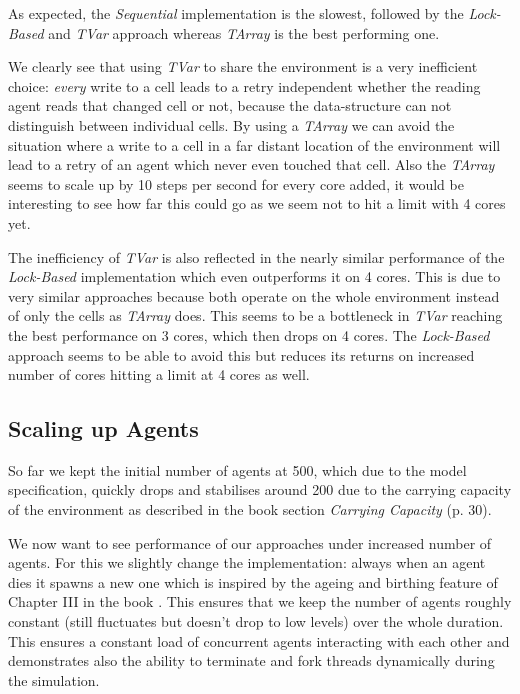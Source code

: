 As expected, the \textit{Sequential} implementation is the slowest, followed by the \textit{Lock-Based} and \textit{TVar} approach whereas \textit{TArray} is the best performing one.

We clearly see that using \textit{TVar} to share the environment is a very inefficient choice: \textit{every} write to a cell leads to a retry independent whether the reading agent reads that changed cell or not, because the data-structure can not distinguish between individual cells. By using a \textit{TArray} we can avoid the situation where a write to a cell in a far distant location of the environment will lead to a retry of an agent which never even touched that cell. Also the \textit{TArray} seems to scale up by 10 steps per second for every core added, it would be interesting to see how far this could go as we seem not to hit a limit with 4 cores yet.

The inefficiency of \textit{TVar} is also reflected in the nearly similar performance of the \textit{Lock-Based} implementation which even outperforms it on 4 cores. This is due to very similar approaches because both operate on the whole environment instead of only the cells as \textit{TArray} does. This seems to be a bottleneck in \textit{TVar} reaching the best performance on 3 cores, which then drops on 4 cores. The \textit{Lock-Based} approach seems to be able to avoid this but reduces its returns on increased number of cores hitting a limit at 4 cores as well.

\subsection{Scaling up Agents}
So far we kept the initial number of agents at 500, which due to the model specification, quickly drops and stabilises around 200 due to the carrying capacity of the environment as described in the book \cite{epstein_growing_1996} section \textit{Carrying Capacity} (p. 30).

We now want to see performance of our approaches under increased number of agents. For this we slightly change the implementation: always when an agent dies it spawns a new one which is inspired by the ageing and birthing feature of Chapter III in the book \cite{epstein_growing_1996}. This ensures that we keep the number of agents roughly constant (still fluctuates but doesn't drop to low levels) over the whole duration. This ensures a constant load of concurrent agents interacting with each other and demonstrates also the ability to terminate and fork threads dynamically during the simulation.

